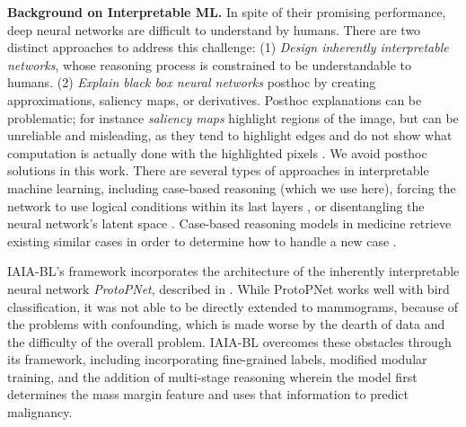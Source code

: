 \documentclass[11pt]{article}
\begin{document}
\noindent\textbf{Background on Interpretable ML.}
In spite of their promising performance, deep neural networks are difficult to understand by humans. There are two distinct approaches to address this challenge: (1) \textit{Design inherently interpretable networks}, whose reasoning process is constrained to be understandable to humans. (2) \textit{Explain black box neural networks} posthoc by creating approximations, saliency maps, or derivatives. Posthoc explanations can be problematic; for instance \textit{saliency maps} highlight regions of the image, but can be unreliable and misleading, as they tend to highlight edges and do not show what computation is actually done with the highlighted pixels \citep{rudin2019stop,adebayo2018sanity,arun2020assessing}.
We avoid posthoc solutions in this work. There are several types of approaches in interpretable machine learning, including case-based reasoning (which we use here), forcing the network to use logical conditions within its last layers \citep[e.g.,][]{wu2019towards}, or disentangling the neural network's latent space \cite[e.g.,][]{chen2020concept}. Case-based reasoning models in medicine retrieve existing similar cases in order to determine how to handle a new case \citep{demigha2004case,macura1995macrad,floyd2000case,kobashi2006computer}.

IAIA-BL's framework incorporates the architecture of the inherently interpretable neural network \textit{ProtoPNet}, described in \cite{PPNet}. While ProtoPNet works well with bird classification, it was not able to be directly extended to mammograms, because of the problems with confounding, which is made worse by the dearth of data and the difficulty of the overall problem. IAIA-BL overcomes these obstacles through its framework, including incorporating fine-grained labels, modified modular training, and the addition of multi-stage reasoning wherein the model first determines the mass margin feature and uses that information to predict malignancy.
\end{document}
